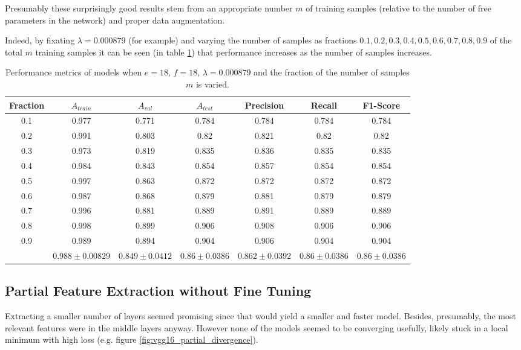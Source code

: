 Presumably these surprisingly good results stem from an appropriate number $m$ of training samples (relative to the number of free parameters in the network) and proper data augmentation.

Indeed, by fixating $\lambda = 0.000879$ (for example) and varying the number of samples as fractions ${0.1, 0.2, 0.3, 0.4, 0.5, 0.6, 0.7, 0.8, 0.9}$ of the total $m$ training samples it can be seen (in table \ref{table:vgg16_total_debug}) that performance increases as the number of samples increases.

\begin{table}[ht]
\centering
\begin{tabular}{ |c|c|c|c|c|c|c| }
\hline
Fraction & $A_{train}$ & $A_{val}$ & $A_{test}$ & Precision & Recall & F1-Score \\
\hline
0.1 & 0.977 & 0.771 & 0.784 & 0.784 & 0.784 & 0.784 \\
0.2 & 0.991 & 0.803 & 0.82  & 0.821 & 0.82  & 0.82  \\
0.3 & 0.973 & 0.819 & 0.835 & 0.836 & 0.835 & 0.835 \\
0.4 & 0.984 & 0.843 & 0.854 & 0.857 & 0.854 & 0.854 \\
0.5 & 0.997 & 0.863 & 0.872 & 0.872 & 0.872 & 0.872 \\
0.6 & 0.987 & 0.868 & 0.879 & 0.881 & 0.879 & 0.879 \\
0.7 & 0.996 & 0.881 & 0.889 & 0.891 & 0.889 & 0.889 \\
0.8 & 0.998 & 0.899 & 0.906 & 0.908 & 0.906 & 0.906 \\
0.9 & 0.989 & 0.894 & 0.904 & 0.906 & 0.904 & 0.904 \\
\hline
 & $0.988\pm0.00829$ & $0.849\pm0.0412$ & $0.86\pm0.0386$ & $0.862\pm0.0392$ & $0.86\pm0.0386$ & $0.86\pm0.0386$ \\
\hline
\end{tabular}
\caption{Performance metrics of models when $e = 18$, $f = 18$, $\lambda = 0.000879$ and the fraction of the number of samples $m$ is varied.}
\label{table:vgg16_total_debug}
\end{table}

\subsection{Partial Feature Extraction without Fine Tuning}

Extracting a smaller number of layers seemed promising since that would yield a smaller and faster model. Besides, presumably, the most relevant features were in the middle layers anyway. However none of the models seemed to be converging usefully, likely stuck in a local minimum with high loss (e.g. figure \ref{fig:vgg16_partial_divergence}).

